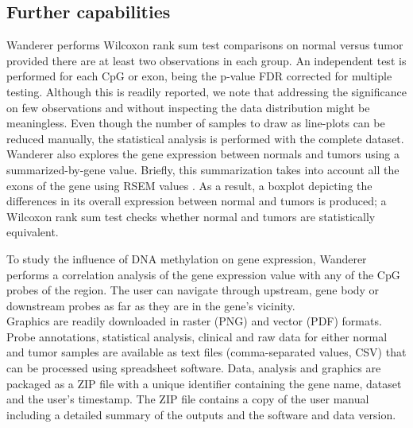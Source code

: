 \documentclass{bmcart}
\begin{document}
\subsection*{Further capabilities}
Wanderer performs Wilcoxon rank sum test comparisons on normal versus tumor provided there are at least two observations in each group. An independent test is performed for each CpG or exon, being the p-value FDR corrected for multiple testing. Although this is readily reported, we note that addressing the significance on few observations and without inspecting the data distribution might be meaningless. Even though the number of samples to draw as line-plots can be reduced manually, the statistical analysis is performed with the complete dataset.\\

{\color{red}
Wanderer also explores the gene expression between normals and tumors using a summarized-by-gene value. {\color{red} Briefly, this summarization takes into account all the exons of the gene using RSEM values \cite{guo2013large}}. As a result, a boxplot depicting the differences in its overall expression between normal and tumors is produced; a Wilcoxon rank sum test checks whether normal and tumors are statistically equivalent.\\
}

{\color{red}
To study the influence of DNA methylation on gene expression, Wanderer performs a correlation analysis of the gene expression value with any of the CpG probes of the region. The user can navigate through upstream, gene body or downstream probes as far as they are in the gene's vicinity.}\\

Graphics are readily downloaded {\color{red} in raster (PNG) and vector (PDF) formats}. Probe annotations, statistical analysis, {\color{red} clinical} and raw data for either normal and tumor samples {\color{red} are available} as text files (comma-separated values, CSV) that can be processed using spreadsheet software. {\color{red} Data, analysis and graphics are packaged as a ZIP file with a unique identifier containing the gene name, dataset and the user's timestamp. The ZIP file contains a copy of the user manual including a detailed summary of the outputs and the software and data version.} \\



\end{document}
